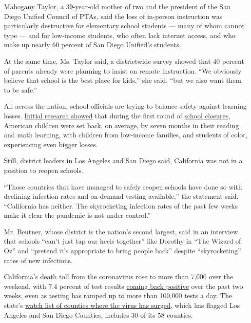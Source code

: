 Mahogany Taylor, a 39-year-old mother of two and the president of the
San Diego Unified Council of PTAs, said the loss of in-person
instruction was particularly destructive for elementary school students
--- many of whom cannot type --- and for low-income students, who often
lack internet access, and who make up nearly 60 percent of San Diego
Unified's students.

At the same time, Ms. Taylor said, a districtwide survey showed that 40
percent of parents already were planning to insist on remote
instruction. ``We obviously believe that school is the best place for
kids,'' she said, ``but we also want them to be safe.''

All across the nation, school officials are trying to balance safety
against learning losses.
\href{https://www.nytimes.com/2020/06/05/us/coronavirus-education-lost-learning.html}{Initial
research showed} that during the first round of
\href{https://www.nytimes.com/2020/07/29/health/covid-school-reopening.html}{school
closures}, American children were set back, on average, by seven months
in their reading and math learning, with children from low-income
families, and students of color, experiencing even bigger losses.

Still, district leaders in Los Angeles and San Diego said, California
was not in a position to reopen schools.

``Those countries that have managed to safely reopen schools have done
so with declining infection rates and on-demand testing available,'' the
statement said. ``California has neither. The skyrocketing infection
rates of the past few weeks make it clear the pandemic is not under
control.''

Mr. Beutner, whose district is the nation's second largest, said in an
interview that schools ``can't just tap our heels together'' like
Dorothy in ``The Wizard of Oz'' and ``pretend it's appropriate to bring
people back'' despite ``skyrocketing'' rates of new infections.

California's death toll from the coronavirus rose to more than 7,000
over the weekend, with 7.4 percent of test results
\href{https://update.covid19.ca.gov/}{coming back positive} over the
past two weeks, even as testing has ramped up to more than 100,000 tests
a day. The state's
\href{https://www.cdph.ca.gov/Programs/CID/DCDC/Pages/COVID-19/CountyMonitoringDataStep2.aspx}{watch
list of counties where the virus has surged}, which has flagged Los
Angeles and San Diego Counties, includes 30 of its 58 counties.

